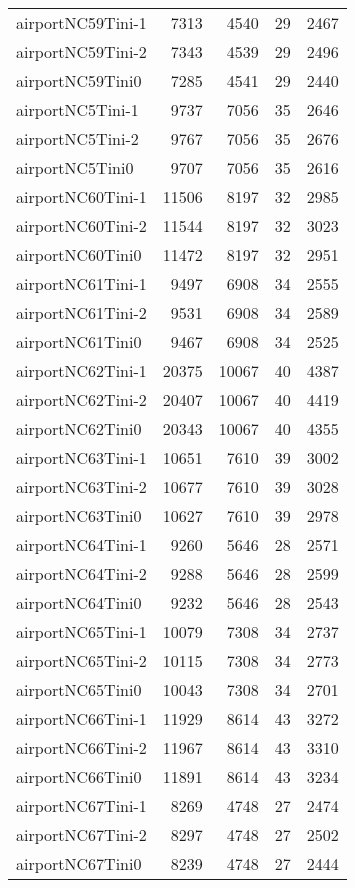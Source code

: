 \begin{tabular}{lrrrr}
airportNC59Tini-1 & 7313 & 4540 & 29 & 2467 \\
airportNC59Tini-2 & 7343 & 4539 & 29 & 2496 \\
airportNC59Tini0 & 7285 & 4541 & 29 & 2440 \\
airportNC5Tini-1 & 9737 & 7056 & 35 & 2646 \\
airportNC5Tini-2 & 9767 & 7056 & 35 & 2676 \\
airportNC5Tini0 & 9707 & 7056 & 35 & 2616 \\
airportNC60Tini-1 & 11506 & 8197 & 32 & 2985 \\
airportNC60Tini-2 & 11544 & 8197 & 32 & 3023 \\
airportNC60Tini0 & 11472 & 8197 & 32 & 2951 \\
airportNC61Tini-1 & 9497 & 6908 & 34 & 2555 \\
airportNC61Tini-2 & 9531 & 6908 & 34 & 2589 \\
airportNC61Tini0 & 9467 & 6908 & 34 & 2525 \\
airportNC62Tini-1 & 20375 & 10067 & 40 & 4387 \\
airportNC62Tini-2 & 20407 & 10067 & 40 & 4419 \\
airportNC62Tini0 & 20343 & 10067 & 40 & 4355 \\
airportNC63Tini-1 & 10651 & 7610 & 39 & 3002 \\
airportNC63Tini-2 & 10677 & 7610 & 39 & 3028 \\
airportNC63Tini0 & 10627 & 7610 & 39 & 2978 \\
airportNC64Tini-1 & 9260 & 5646 & 28 & 2571 \\
airportNC64Tini-2 & 9288 & 5646 & 28 & 2599 \\
airportNC64Tini0 & 9232 & 5646 & 28 & 2543 \\
airportNC65Tini-1 & 10079 & 7308 & 34 & 2737 \\
airportNC65Tini-2 & 10115 & 7308 & 34 & 2773 \\
airportNC65Tini0 & 10043 & 7308 & 34 & 2701 \\
airportNC66Tini-1 & 11929 & 8614 & 43 & 3272 \\
airportNC66Tini-2 & 11967 & 8614 & 43 & 3310 \\
airportNC66Tini0 & 11891 & 8614 & 43 & 3234 \\
airportNC67Tini-1 & 8269 & 4748 & 27 & 2474 \\
airportNC67Tini-2 & 8297 & 4748 & 27 & 2502 \\
airportNC67Tini0 & 8239 & 4748 & 27 & 2444 \\

\end{tabular}
